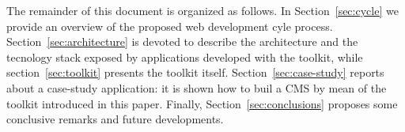The remainder of this document is organized as follows. In
Section~\ref{sec:cycle} we provide an overview of the proposed web development cyle process. Section~\ref{sec:architecture} is devoted to describe the architecture and the tecnology stack exposed by applications developed with the toolkit, while section~\ref{sec:toolkit} presents the toolkit itself. Section~\ref{sec:case-study} reports about a case-study application: it is shown how to buil a CMS by mean of the toolkit introduced in this paper. Finally, Section~\ref{sec:conclusions} proposes some conclusive remarks and future developments.





